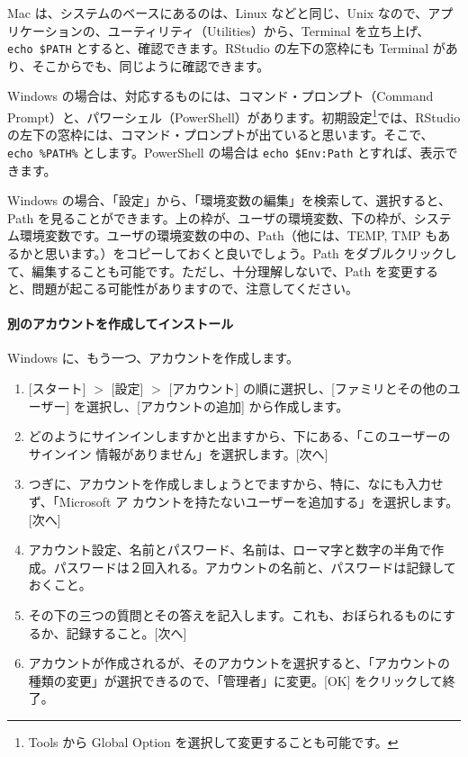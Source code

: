 \documentclass[
  xelatex, ja=standard]{bxjsbook}
\theoremstyle{definition}
\theoremstyle{definition}
\theoremstyle{definition}
\theoremstyle{definition}
\theoremstyle{remark}
\begin{document}
Mac は、システムのベースにあるのは、Linux などと同じ、Unix なので、アプリケーションの、ユーティリティ（Utilities）から、Terminal を立ち上げ、 \texttt{echo\ \$PATH} とすると、確認できます。RStudio の左下の窓枠にも Terminal があり、そこからでも、同じように確認できます。

Windows の場合は、対応するものには、コマンド・プロンプト（Command Prompt）と、パワーシェル（PowerShell）があります。初期設定\footnote{Tools から Global Option を選択して変更することも可能です。}では、RStudio の左下の窓枠には、コマンド・プロンプトが出ていると思います。そこで、\texttt{echo\ \%PATH\%} とします。PowerShell の場合は \texttt{echo\ \$Env:Path} とすれば、表示できます。

Windows の場合、「設定」から、「環境変数の編集」を検索して、選択すると、Path を見ることができます。上の枠が、ユーザの環境変数、下の枠が、システム環境変数です。ユーザの環境変数の中の、Path（他には、TEMP, TMP もあるかと思います。）をコピーしておくと良いでしょう。Path をダブルクリックして、編集することも可能です。ただし、十分理解しないで、Path を変更すると、問題が起こる可能性がありますので、注意してください。

\hypertarget{ux5225ux306eux30a2ux30abux30a6ux30f3ux30c8ux3092ux4f5cux6210ux3057ux3066ux30a4ux30f3ux30b9ux30c8ux30fcux30eb}{%
\paragraph{別のアカウントを作成してインストール}\label{ux5225ux306eux30a2ux30abux30a6ux30f3ux30c8ux3092ux4f5cux6210ux3057ux3066ux30a4ux30f3ux30b9ux30c8ux30fcux30eb}}

Windows に、もう一つ、アカウントを作成します。

\begin{enumerate}
\def\labelenumi{\arabic{enumi}.}
\item
  {[}スタート{]} \(>\) {[}設定{]} \(>\) {[}アカウント{]} の順に選択し、{[}ファミリとその他のユーザー{]} を選択し、{[}アカウントの追加{]} から作成します。
\item
  どのようにサインインしますかと出ますから、下にある、「このユーザーのサインイン 情報がありません」を選択します。{[}次へ{]}
\item
  つぎに、アカウントを作成しましょうとでますから、特に、なにも入力せず、「Microsoft ア カウントを持たないユーザーを追加する」を選択します。{[}次へ{]}
\item
  アカウント設定、名前とパスワード、名前は、ローマ字と数字の半角で作成。パスワードは２回入れる。アカウントの名前と、パスワードは記録しておくこと。
\item
  その下の三つの質問とその答えを記入します。これも、おぼられるものにするか、記録すること。{[}次へ{]}
\item
  アカウントが作成されるが、そのアカウントを選択すると、「アカウントの種類の変更」が選択できるので、「管理者」に変更。{[}OK{]} をクリックして終了。
\end{enumerate}
\end{document}
